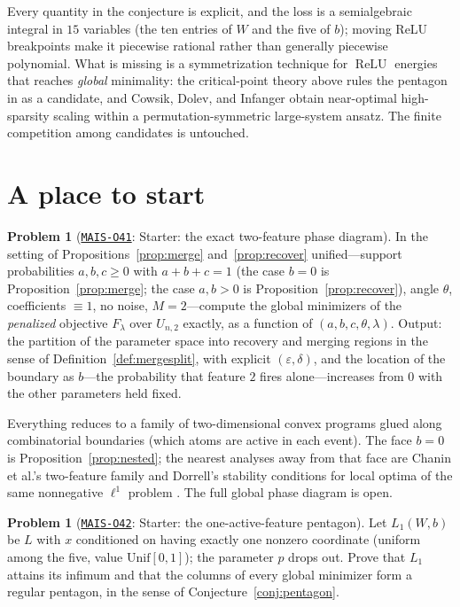\documentclass[11pt]{amsart}
\newcommand{\Oid}[1]{\href{https://github.com/lionellevine/MAIS/blob/main/open-problems/MAIS-O#1.md}{\texttt{MAIS-O#1}}}
\theoremstyle{plain}
\theoremstyle{definition}
\newtheorem{problem}[theorem]{Problem}
\DeclareMathOperator{\relu}{ReLU}
\begin{document}
Every quantity in the conjecture is explicit, and the loss is a semialgebraic integral in $15$ variables (the ten entries of $W$ and the five of $b$); moving ReLU breakpoints make it piecewise rational rather than generally piecewise polynomial. What is missing is a symmetrization technique for $\relu$ energies that reaches \emph{global} minimality: the critical-point theory above \cite{chen2023,ivanov2026} rules the pentagon in as a candidate, and Cowsik, Dolev, and Infanger \cite{cowsik2024} obtain near-optimal high-sparsity scaling within a permutation-symmetric large-system ansatz. The finite competition among candidates is untouched.

\section{A place to start}\label{sec:start}

\begin{problem}[\Oid{41}: Starter: the exact two-feature phase diagram]\label{prob:starter-phase}
In the setting of Propositions~\ref{prop:merge} and~\ref{prop:recover} unified---support probabilities $a,b,c\ge0$ with $a+b+c=1$ (the case $b=0$ is Proposition~\ref{prop:merge}; the case $a,b>0$ is Proposition~\ref{prop:recover}), angle $\theta$, coefficients $\equiv1$, no noise, $M=2$---compute the global minimizers of the \emph{penalized} objective $F_\lambda$ over $U_{n,2}$ exactly, as a function of $(a,b,c,\theta,\lambda)$. Output: the partition of the parameter space into recovery and merging regions in the sense of Definition~\ref{def:mergesplit}, with explicit $(\varepsilon,\delta)$, and the location of the boundary as $b$---the probability that feature $2$ fires alone---increases from $0$ with the other parameters held fixed.
\end{problem}

Everything reduces to a family of two-dimensional convex programs glued along combinatorial boundaries (which atoms are active in each event). The face $b=0$ is Proposition~\ref{prop:nested}; the nearest analyses away from that face are Chanin et al.'s two-feature family \cite{chanin2024} and Dorrell's stability conditions for local optima of the same nonnegative $\ell^1$ problem \cite{dorrell2026}. The full global phase diagram is open.

\begin{problem}[\Oid{42}: Starter: the one-active-feature pentagon]\label{prob:starter-pentagon}
Let $L_1(W,b)$ be $L$ with $x$ conditioned on having exactly one nonzero coordinate (uniform among the five, value $\mathrm{Unif}[0,1]$); the parameter $p$ drops out. Prove that $L_1$ attains its infimum and that the columns of every global minimizer form a regular pentagon, in the sense of Conjecture~\ref{conj:pentagon}.
\end{problem}
\end{document}

